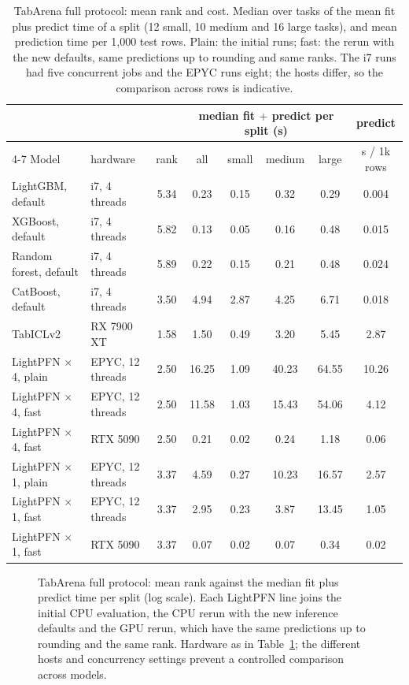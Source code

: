 \documentclass[11pt]{article}
\begin{document}
\begin{table}[t]
\centering
\footnotesize
\setlength{\tabcolsep}{4pt}
\begin{tabular}{llcccccc}
\toprule
& & & \multicolumn{4}{c}{median fit $+$ predict per split (s)} & predict \\
\cmidrule(lr){4-7}
Model & hardware & rank & all & small & medium & large & s / 1k rows \\
\midrule
LightGBM, default & i7, 4 threads & 5.34 & 0.23 & 0.15 & 0.32 & 0.29 & 0.004 \\
XGBoost, default & i7, 4 threads & 5.82 & 0.13 & 0.05 & 0.16 & 0.48 & 0.015 \\
Random forest, default & i7, 4 threads & 5.89 & 0.22 & 0.15 & 0.21 & 0.48 & 0.024 \\
CatBoost, default & i7, 4 threads & 3.50 & 4.94 & 2.87 & 4.25 & 6.71 & 0.018 \\
TabICLv2 & RX 7900 XT & 1.58 & 1.50 & 0.49 & 3.20 & 5.45 & 2.87 \\
\midrule
LightPFN $\times$4, plain & EPYC, 12 threads & 2.50 & 16.25 & 1.09 & 40.23 & 64.55 & 10.26 \\
\rowcolor{orange!12}
LightPFN $\times$4, fast & EPYC, 12 threads & 2.50 & 11.58 & 1.03 & 15.43 & 54.06 & 4.12 \\
LightPFN $\times$4, fast & RTX 5090 & 2.50 & 0.21 & 0.02 & 0.24 & 1.18 & 0.06 \\
LightPFN $\times$1, plain & EPYC, 12 threads & 3.37 & 4.59 & 0.27 & 10.23 & 16.57 & 2.57 \\
LightPFN $\times$1, fast & EPYC, 12 threads & 3.37 & 2.95 & 0.23 & 3.87 & 13.45 & 1.05 \\
LightPFN $\times$1, fast & RTX 5090 & 3.37 & 0.07 & 0.02 & 0.07 & 0.34 & 0.02 \\
\bottomrule
\end{tabular}
\caption{TabArena full protocol: mean rank and cost. Median over tasks of the mean fit plus predict time of a
split (12 small, 10 medium and 16 large tasks), and mean prediction time per 1,000 test rows. Plain: the initial
runs; fast: the rerun with the new defaults, same predictions up to rounding and same ranks. The i7 runs had
five concurrent jobs and the EPYC runs eight; the hosts differ, so the comparison across rows is indicative.}
\label{tab:tabcost}
\end{table}

\begin{figure}[tbp]
\centering

\caption{TabArena full protocol: mean rank against the median fit plus predict time per split (log scale). Each
LightPFN line joins the initial CPU evaluation, the CPU rerun with the new inference defaults and the GPU rerun, which
have the same predictions up to rounding and the same rank. Hardware as in Table~\ref{tab:tabcost};
the different hosts and concurrency settings prevent a controlled comparison across models.}
\label{fig:tabcost}
\end{figure}
\end{document}

